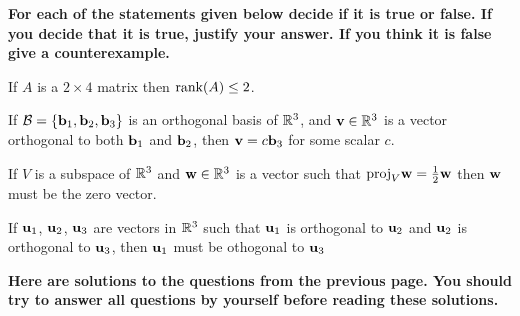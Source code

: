 \newpage

{\bf For each of the statements given below decide if it is true or false. If you decide that it is true, justify your answer. 
If you think it is false give a counterexample. }

\vskip 10mm

\benu


\item[\bf a)]  If $A$ is a $2\times 4$ matrix then  $\text{rank}(A) \leq 2$.  


\vskip 10mm


\item[\bf b)] If ${\mathcal B} = \{{\bf b}_{1}, {\bf b}_{2}, {\bf b}_{3}\}$ is an orthogonal basis of ${\mathbb R}^{3}$, 
and ${\bf v}\in {\mathbb R}^{3}$ is a vector orthogonal to both ${\bf b}_{1}$ and ${\bf b}_{2}$, then ${\bf v} = c{\bf b}_{3}$ for 
some scalar $c$. 


\vskip 10mm

\item[\bf c)]  If $V$ is a subspace of ${\mathbb R}^{3}$ and ${\bf w}\in {\mathbb R}^{3}$ is a vector such that 
$\text{proj}_{V}{\bf w} = \frac{1}{2}{\bf w}$ then ${\bf w}$ must be the zero vector.  


\vskip 10mm


\item[\bf d)]  If ${\bf u}_{1}$, ${\bf u}_{2}$, ${\bf u}_{3}$ are vectors in ${\mathbb R}^{3}$ such that ${\bf u}_{1}$ is orthogonal 
to ${\bf u}_{2}$ and ${\bf u}_{2}$ is orthogonal to ${\bf u}_{3}$, then ${\bf u}_{1}$ must be othogonal to ${\bf u}_{3}$ 




\eenu


\newpage

{\bf Here are solutions to the questions from the previous page. You should try to answer all 
questions by yourself before reading these solutions.}

\vskip 5mm 

